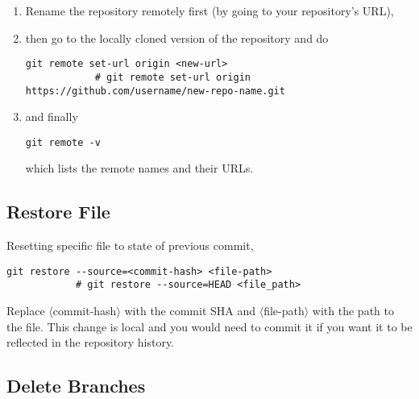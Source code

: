 \documentclass[12pt, a4paper]{article}
\numberwithin{equation}{section}
\theoremstyle{definition}
\theoremstyle{definition}
\begin{document}
	\begin{enumerate}
		\item Rename the repository remotely first (by going to your repository's URL), 
		\item then go to the locally cloned version of the repository and do
		
		\begin{lstlisting}[style=mystylebash, label=alg:git__rename_repo, xleftmargin=\parindent]
			git remote set-url origin <new-url>
			# git remote set-url origin https://github.com/username/new-repo-name.git 
		\end{lstlisting}
		
		\item and finally 
		
		\begin{lstlisting}[style=mystylebash, label=alg:git__check_remote_url, xleftmargin=\parindent]
			git remote -v
		\end{lstlisting}
		
		which lists the remote names and their URLs.
		
	\end{enumerate}

	\subsection{Restore File}
	
		Resetting specific file to state of previous commit,
		
		\begin{lstlisting}[style=mystylebash, label=alg:git_restore, xleftmargin=\parindent]
			git restore --source=<commit-hash> <file-path>
			# git restore --source=HEAD <file_path>
		\end{lstlisting}
		
		\noindent Replace $\langle$commit-hash$\rangle$ with the commit SHA and $\langle$file-path$\rangle$ with the path to the file. This change is local and you would need to commit it if you want it to be reflected in the repository history.
	
	\subsection{Delete Branches}
	
\end{document}
